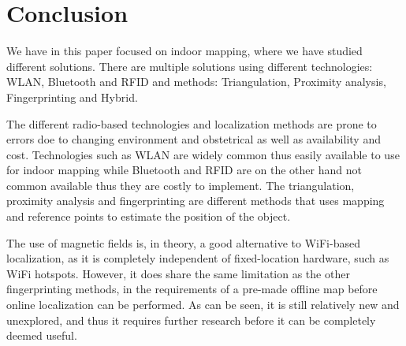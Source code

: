 \section{Conclusion}
We have in this paper focused on indoor mapping, where we have studied different solutions.
There are multiple solutions using different technologies: WLAN, Bluetooth and RFID and methods: Triangulation, Proximity analysis, Fingerprinting and Hybrid.

The different radio-based technologies and localization methods are prone to errors doe to changing environment and obstetrical as well as availability and cost.
Technologies such as WLAN are widely common thus easily available to use for indoor mapping while Bluetooth and RFID are on the other hand not common available thus they are costly to implement.
The triangulation, proximity analysis and fingerprinting are different methods that uses mapping and reference points to estimate the position of the object.

The use of magnetic fields is, in theory, a good alternative to WiFi-based localization, as it is completely independent of fixed-location hardware, such as WiFi hotspots.
However, it does share the same limitation as the other fingerprinting methods, in the requirements of a pre-made offline map before online localization can be performed.
As can be seen, it is still relatively new and unexplored, and thus it requires further research before it can be completely deemed useful.
